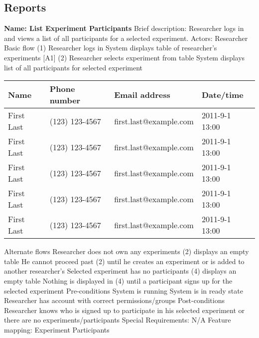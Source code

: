 \subsection{Reports}
\begin{outline}[enumerate]

\1 {\bf Name: List Experiment Participants}
\2 Brief description: Researcher logs in and views a list of all participants for a selected experiment.
\2 Actors: Researcher
\2 Basic flow
\3 (1) Researcher logs in
\3 System displays table of researcher's experiments [A1]
\3 (2) Researcher selects experiment from table
\3 System displays list of all participants for selected experiment
        \begin{table}
            \begin{tabular}{|l|l|l|l|}
                \hline
                Name       & Phone number   & Email address          & Date/time      \\ \hline
                First Last & (123) 123-4567 & first.last@example.com & 2011-9-1 13:00 \\
                First Last & (123) 123-4567 & first.last@example.com & 2011-9-1 13:00 \\
                First Last & (123) 123-4567 & first.last@example.com & 2011-9-1 13:00 \\
                First Last & (123) 123-4567 & first.last@example.com & 2011-9-1 13:00 \\
                First Last & (123) 123-4567 & first.last@example.com & 2011-9-1 13:00 \\
                \hline
            \end{tabular}
        \end{table}
\2 Alternate flows
\3 [A1] Researcher does not own any experiments
\4 (2) displays an empty table
\4 He cannot proceed past (2) until he creates an experiment or is added to another researcher's
\3 Selected experiment has no participants
\4 (4) displays an empty table
\4 Nothing is displayed in (4) until a participant signs up for the selected experiment
\2 Pre-conditions
\3 System is running
\3 System is in ready state
\3 Researcher has account with correct permissions/groups
\2 Post-conditions
\3 Researcher knows who is signed up to participate in his selected experiment or there are no experiments/participants
\2 Special Requirements:
\3 N/A
\2 Feature mapping:
\3 Experiment Participants



\end{outline}
